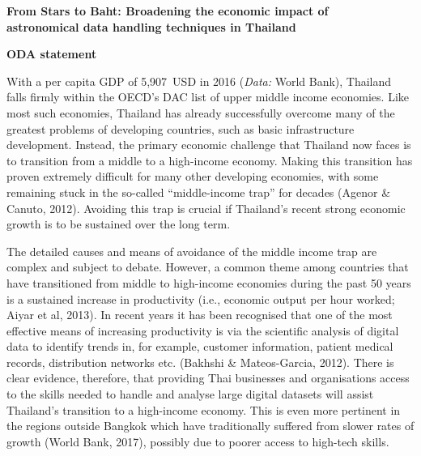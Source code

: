 \documentclass[11pt]{article}
\begin{document}
  \setcounter{figure}{0}
  \noindent
  {\LARGE \bf From Stars to Baht: Broadening the economic impact of \\
  astronomical data handling techniques in Thailand}
  
  \vspace{3mm}
  \noindent
  {\LARGE \bf ODA statement}
  
  \vspace{2mm}
  \noindent
  With a per capita GDP of 5,907~USD in 2016 ({\it Data:} World Bank), Thailand falls firmly within the OECD's DAC list of upper middle income economies. Like most such economies, Thailand has already successfully overcome many of the greatest problems of developing countries, such as basic infrastructure development. Instead, the primary economic challenge that Thailand now faces is to transition from a middle to a high-income economy. Making this transition has proven extremely difficult for many other developing economies, with some remaining stuck in the so-called ``middle-income trap'' for decades (Agenor \& Canuto, 2012). Avoiding this trap is crucial if Thailand's recent strong economic growth is to be sustained over the long term.     
  
  \vspace{2mm}
  \noindent
  The detailed causes and means of avoidance of the middle income trap are complex and subject to debate. However, a common theme among countries that have transitioned from middle to high-income economies during the past 50 years is a sustained increase in productivity (i.e., economic output per hour worked; Aiyar et al, 2013). In recent years it has been recognised that one of the most effective means of increasing productivity is via the scientific analysis of digital data to identify trends in, for example, customer information, patient medical records, distribution networks etc. (Bakhshi \& Mateos-Garcia, 2012). There is clear evidence, therefore, that providing Thai businesses and organisations access to the skills needed to handle and analyse large digital datasets will assist Thailand's transition to a high-income economy. This is even more pertinent in the regions outside Bangkok which have traditionally suffered from slower rates of growth (World Bank, 2017), possibly due to poorer access to high-tech skills.    
  
\end{document}
